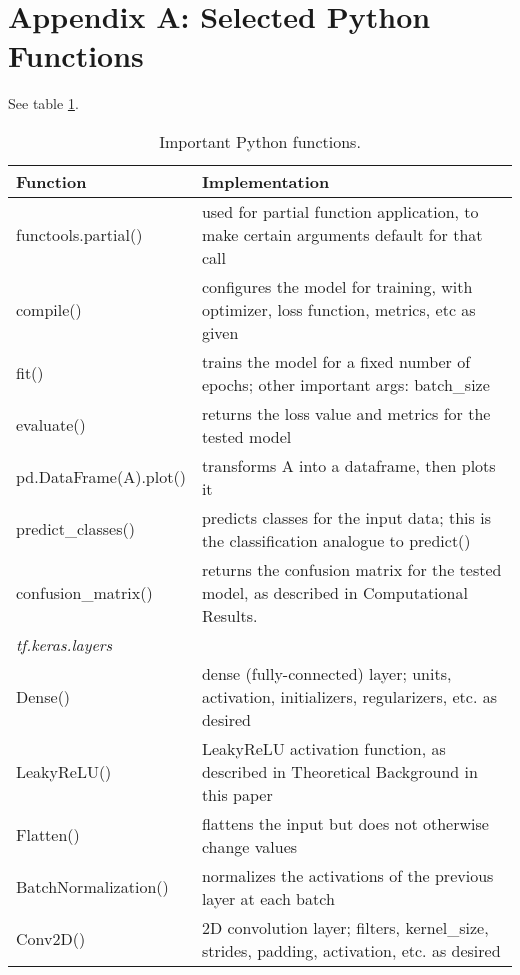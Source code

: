 \documentclass[a4paper,10 pt]{article}
\begin{document}
\section{Appendix A: Selected Python Functions}
See table \ref{tab:func}.
\begin{table}[]
\begin{tabular}{|l|l|}
\hline
\textbf{Function} & \textbf{Implementation} \\ \hline
functools.partial() & used for partial function application, to make certain arguments default for that call \\ \hline
compile() & configures the model for training, with optimizer, loss function, metrics, etc as given \\ \hline
fit() & trains the model for a fixed number of epochs; other important args: batch\_size \\ \hline
evaluate() & returns the loss value and metrics for the tested model \\ \hline
pd.DataFrame(A).plot() & transforms A into a dataframe, then plots it \\ \hline
predict\_classes() & predicts classes for the input data; this is the classification analogue to predict() \\ \hline
confusion\_matrix() & returns the confusion matrix for the tested model, as described in Computational Results. \\ \hline
\multicolumn{2}{|l|}{\textit{\quad\quad tf.keras.layers}} \\ \hline
Dense() & dense (fully-connected) layer; units, activation, initializers, regularizers, etc. as desired \\ \hline
LeakyReLU() & LeakyReLU activation function, as described in Theoretical Background in this paper \\ \hline
Flatten() & flattens the input but does not otherwise change values \\ \hline
BatchNormalization() & normalizes the activations of the previous layer at each batch \\ \hline
Conv2D() & 2D convolution layer; filters, kernel\_size, strides, padding, activation, etc. as desired \\ \hline
\end{tabular}
\caption{Important Python functions.}
\label{tab:func}
\end{table}
\end{document}
